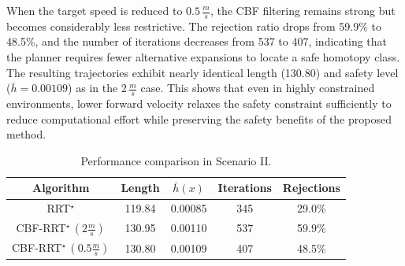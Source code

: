 \documentclass[letterpaper, 10 pt, conference]{ieeeconf}
\begin{document}
When the target speed is reduced to $0.5\,\frac{m}{s}$, the CBF filtering
remains strong but becomes considerably less restrictive. The rejection ratio
drops from 59.9\% to 48.5\%, and the number of iterations decreases from 537 to
407, indicating that the planner requires fewer alternative expansions to locate
a safe homotopy class. The resulting trajectories exhibit nearly identical
length (130.80) and safety level ($\bar h=0.00109$) as in the
$2\,\frac{m}{s}$ case. This shows that even in highly constrained environments,
lower forward velocity relaxes the safety constraint sufficiently to reduce
computational effort while preserving the safety benefits of the proposed
method.

\begin{table}[h]
\caption{Performance comparison in Scenario II.}
\begin{center}
\begin{tabular}{|c|c|c|c|c|}
    \hline
    Algorithm       & Length   & $\bar{h}(x)$    & Iterations    &   Rejections\\
    \hline
    RRT$^\star$     & 119.84    & 0.00085   & 345   & 29.0\%   \\
    \hline
    CBF-RRT$^\star\,\left(2\frac{m}{s}\right)$ & 130.95    & 0.00110   & 537   & 59.9\% \\
    \hline
    CBF-RRT$^\star\,\left(0.5\frac{m}{s}\right)$ & 130.80    & 0.00109   & 407   & 48.5\% \\
    \hline
\end{tabular}
\end{center}
\label{tab:performance_scenario_ii}
\end{table}

\end{document}
